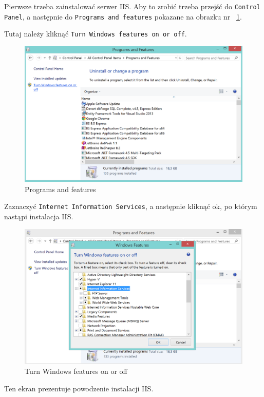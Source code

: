 \documentclass[10pt,titlepage]{article}
\begin{document}
\par Pierwsze trzeba zainstalować serwer IIS. Aby to zrobić trzeba przejść do \verb|Control Panel|, a następnie do \verb|Programs and features| pokazane na obrazku nr ~\ref{install:programs}.
\par Tutaj należy kliknąć \verb|Turn Windows features on or off|.
\begin{figure}[H]
  \centering
  \includegraphics[scale=0.35]{images/install1.png}
  \caption{Programs and features}
  \label{install:programs}
\end{figure}
\par Zaznaczyć \verb|Internet Information Services|, a następnie kliknąć ok, po którym nastąpi instalacja IIS.
\begin{figure}[H]
  \centering
  \includegraphics[scale=0.35]{images/install2.png}
  \caption{Turn Windows features on or off}
\end{figure}
\par Ten ekran prezentuje powodzenie instalacji IIS.
\end{document}
